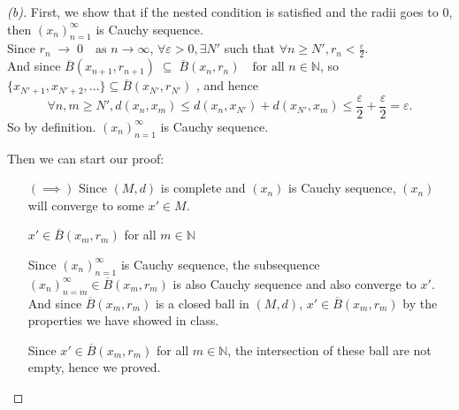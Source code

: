 \begin{proof}[(b)]
    First, we show that if the nested condition is satisfied and the radii goes to \(0\), then $(x_n)_{n=1}^\infty$ is Cauchy sequence. \\
    Since $r_n \;\to\; 0 \quad\text{as } n\to\infty$, $\forall \varepsilon > 0, \exists N'$ such that $\forall n \geq N', r_n < \frac{\varepsilon}{2}$. \\
    And since $\overline{B}(x_{n+1},r_{n+1}) \;\subseteq\; \overline{B}(x_n,r_n) \quad\text{for all } n\in\mathbb{N}$, so $\{x_{N'+1},x_{N'+2}, ...\} \subseteq \overline{B}(x_{N'},r_{N'})$ , and hence
    \[
    \forall n, m \geq N', d(x_n, x_m) \leq d(x_n, x_{N'}) + d(x_{N'}, x_m) \leq \frac{\varepsilon}{2} + \frac{\varepsilon}{2} = \varepsilon.
    \]
    So by definition. $(x_n)_{n=1}^\infty$ is Cauchy sequence.

    Then we can start our proof:
    \begin{itemize}
        \item [\((\implies )\)] Since $(M,d)$ is complete and $(x_n)$ is Cauchy sequence, $(x_n)$ will converge to some $x' \in M$. \\
        \begin{claim}
            $x' \in \overline{B}(x_m,r_m)$ for all $m \in \mathbb{N}$
        \end{claim}
        \begin{explanation}
            Since $(x_n)_{n=1}^\infty$ is Cauchy sequence, the subsequence $(x_n)_{n=m}^\infty \in \overline{B}(x_m,r_m)$ is also Cauchy sequence and also converge to $x'$. \\
            And since $\overline{B}(x_m,r_m)$ is a closed ball in $(M, d)$, $x' \in \overline{B}(x_m,r_m)$ by the properties we have showed in class.
        \end{explanation}
        Since $x' \in \overline{B}(x_m,r_m)$ for all $m \in \mathbb{N}$, the intersection of these ball are not empty, hence we proved.


\end{itemize}
\end{proof}
